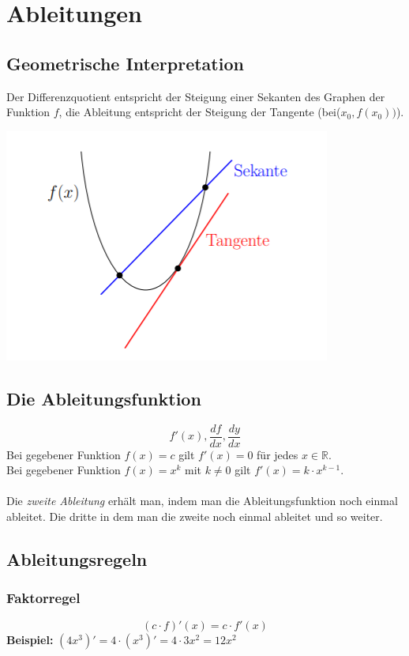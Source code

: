 \newpage

\section{Ableitungen}

\subsection{Geometrische Interpretation}
Der Differenzquotient entspricht der Steigung einer Sekanten des Graphen der
Funktion $f$, die Ableitung entspricht der Steigung der Tangente 
(bei($x_0, f(x_0))$).

\begin{center}
    \includegraphics[width=0.5\linewidth]{images/ableitungen.png}
\end{center}

\subsection{Die Ableitungsfunktion}
\[
    f'(x), \frac{df}{dx}, \frac{dy}{dx}
\]
Bei gegebener Funktion $f(x) = c$ gilt $f'(x)=0$ für jedes $x \in \mathbb{R}$. \\
Bei gegebener Funktion $f(x)=x^k$ mit $k\neq 0$ gilt $f'(x)=k \cdot x^{k-1}$. \\
\\
Die \textit{zweite Ableitung} erhält man, indem man die Ableitungsfunktion noch einmal ableitet. Die dritte in dem man die zweite noch einmal ableitet und so weiter.

\subsection{Ableitungsregeln}
\subsubsection{Faktorregel}
\[
    (c \cdot f)'(x) = c \cdot f'(x)
\]
\textbf{Beispiel: } $(4x^3)'=4 \cdot (x^3)' = 4 \cdot 3x^2 = 12x^2$

